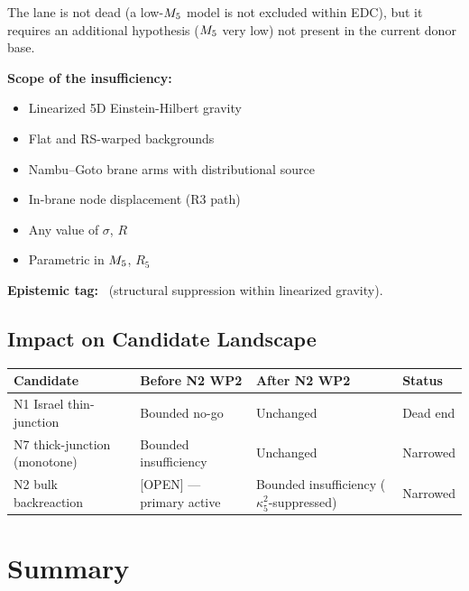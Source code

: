 \begin{resultbox}[title=N2 WP2 Outcome: Bounded Insufficiency
    (Structural $\kappa_5^2$-Suppression)]
The lane is not dead (a low-$M_5$ model is not excluded within
EDC), but it requires an additional hypothesis ($M_5$ very low)
not present in the current donor base.

\textbf{Scope of the insufficiency:}
\begin{itemize}
    \item Linearized 5D Einstein-Hilbert gravity
    \item Flat and RS-warped backgrounds
    \item Nambu--Goto brane arms with distributional source
    \item In-brane node displacement (R3 path)
    \item Any value of $\sigma$, $R$
    \item Parametric in $M_5$, $R_5$
\end{itemize}

\textbf{Epistemic tag:} \tagDc\ (structural suppression within
linearized gravity).
\end{resultbox}

\subsection{Impact on Candidate Landscape}

\begin{center}
\begin{tabular}{llll}
\toprule
\textbf{Candidate} & \textbf{Before N2 WP2} & \textbf{After N2 WP2}
& \textbf{Status} \\
\midrule
N1 Israel thin-junction & Bounded no-go & Unchanged & Dead end \\
N7 thick-junction (monotone) & Bounded insufficiency & Unchanged
& Narrowed \\
N2 bulk backreaction & [OPEN] --- primary active & Bounded insufficiency
($\kappa_5^2$-suppressed) & Narrowed \\
\bottomrule
\end{tabular}
\end{center}

\section{Summary}
\label{sec:P2N2:summary}

